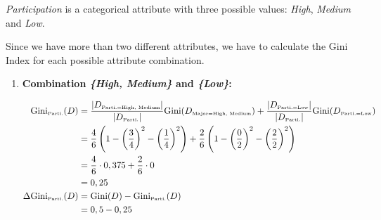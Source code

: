 \documentclass[
english,
smallborders
]{i6prcsht}
\newcommand{\OfSpecificValue}[3]{_{\text{\tiny #1#2#3}}}
\newcommand{\OfAttribute}[1]{_{\text{\tiny #1}}}
\begin{document}
\begin{solution}
\begin{enumerate}
\begin{enumerate}
\begin{enumerate}
				                  \textit{Participation} is a categorical attribute with three possible values: \textit{High}, \textit{Medium} and \textit{Low}.

				                  Since we have more than two different attributes, we have to calculate the Gini Index for each possible attribute combination.

				                  \begin{enumerate}
					                  \item \textbf{Combination \textit{\{High, Medium\}} and \textit{\{Low\}}:}

					                        \begin{alignat*}{2}
						                        \text{Gini}\OfAttribute{Parti.}(D)       & = \frac{|D\OfSpecificValue{Parti.}{=}{High, Medium}|}{|D\OfAttribute{Parti.}|} \text{Gini}(D\OfSpecificValue{Major}{=}{High, Medium}) + \frac{|D\OfSpecificValue{Parti.}{=}{Low}|}{|D\OfAttribute{Parti.}|} \text{Gini}(D\OfSpecificValue{Parti.}{=}{Low}) \\
						                                                                 & = \frac{4}{6} \left(1 - \left(\frac{3}{4}\right)^2 - \left(\frac{1}{4}\right)^2\right) + \frac{2}{6} \left(1 - \left(\frac{0}{2}\right)^2 - \left(\frac{2}{2}\right)^2\right)                                                                              \\
						                                                                 & = \frac{4}{6} \cdot 0,375 + \frac{2}{6} \cdot 0                                                                                                                                                                                                            \\
						                                                                 & = 0,25                                                                                                                                                                                                                                                     \\
						                        \Delta\text{Gini}\OfAttribute{Parti.}(D) & = \text{Gini}(D) - \text{Gini}\OfAttribute{Parti.}(D)                                                                                                                                                                                                      \\
						                                                                 & = 0,5 - 0,25                                                                                                                                                                                                                                               \\

\end{alignat*}
\end{enumerate}
\end{enumerate}
\end{enumerate}
\end{enumerate}
\end{solution}
\end{document}
